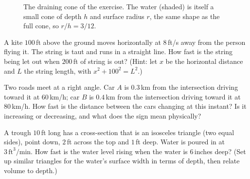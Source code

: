 \begin{figure}[htbp]
\centering
{}
\caption{The draining cone of the exercise. The water (shaded) is itself a small cone of depth $h$
and surface radius $r$, the same shape as the full cone, so $r/h = 3/12$.}
\label{ch13:fig-cone}
\end{figure}

\begin{exercise}
A kite $100$\,ft above the ground moves horizontally at $8$\,ft/s away from the person flying it. The
string is taut and runs in a straight line. How fast is the string being let out when $200$\,ft of
string is out? (Hint: let $x$ be the horizontal distance and $L$ the string length, with $x^2 +
100^2 = L^2$.)
\end{exercise}

\begin{exercise}
Two roads meet at a right angle. Car $A$ is $0.3$\,km from the intersection driving toward it at
$60$\,km/h; car $B$ is $0.4$\,km from the intersection driving toward it at $80$\,km/h. How fast is
the distance between the cars changing at this instant? Is it increasing or decreasing, and what does
the sign mean physically?
\end{exercise}

\begin{exercise}
A trough $10$\,ft long has a cross-section that is an isosceles triangle (two equal sides), point
down, $2$\,ft across the top and
$1$\,ft deep. Water is poured in at $3\,\text{ft}^3/\text{min}$. How fast is the water level rising when the water
is $6$\,inches deep? (Set up similar triangles for the water's surface width in terms of depth, then
relate volume to depth.)
\end{exercise}

